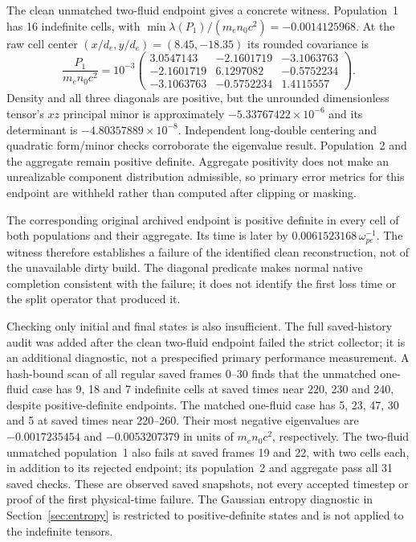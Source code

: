 The clean unmatched two-fluid endpoint gives a concrete witness. Population~1
has 16 indefinite cells, with
$\min\lambda(P_1)/(m_en_0c^2)=-0.0014125968$. At the raw
cell center $(x/d_e,y/d_e)=(8.45,-18.35)$ its rounded covariance is
\[
\frac{P_1}{m_en_0c^2}=10^{-3}
\begin{pmatrix}
 3.0547143&-2.1601719&-3.1063763\\
 -2.1601719&6.1297082&-0.5752234\\
 -3.1063763&-0.5752234&1.4115557
\end{pmatrix}.
\]
Density and all three diagonals are positive, but the unrounded dimensionless
tensor's $xz$ principal minor is approximately $-5.33767422\times10^{-6}$ and its determinant is
$-4.80357889\times10^{-8}$. Independent long-double centering and quadratic
form/minor checks corroborate the eigenvalue result. Population~2 and the
aggregate remain positive definite. Aggregate positivity does not make an
unrealizable component distribution admissible, so primary error metrics for
this endpoint are withheld rather than computed after clipping or masking.

The corresponding original archived endpoint is positive definite in every
cell of both populations and their aggregate. Its time is later by
$0.0061523168\,\omega_{pe}^{-1}$. The witness therefore establishes a failure
of the identified clean reconstruction, not of the unavailable dirty build.
The diagonal predicate makes normal native completion consistent with the
failure; it does not identify the first loss time or the split operator that
produced it.

Checking only initial and final states is also insufficient. The full
saved-history audit was added after the clean two-fluid endpoint failed the
strict collector; it is an additional diagnostic, not a prespecified primary
performance measurement. A hash-bound
scan of all regular saved frames 0--30 finds that the unmatched one-fluid
case has 9, 18 and 7 indefinite cells at saved times near 220, 230 and 240,
despite positive-definite endpoints. The matched one-fluid case has 5, 23,
47, 30 and 5 at saved times near 220--260. Their most negative eigenvalues
are $-0.0017235454$ and $-0.0053207379$ in units of $m_en_0c^2$,
respectively. The two-fluid unmatched
population~1 also fails at saved frames 19 and 22, with two cells each,
in addition to its rejected endpoint; its population~2 and aggregate pass
all 31 saved checks. These are observed saved snapshots, not every accepted
timestep or proof of the first physical-time failure. The Gaussian entropy
diagnostic in Section~\ref{sec:entropy} is restricted to positive-definite
states and is not applied to the indefinite tensors.

